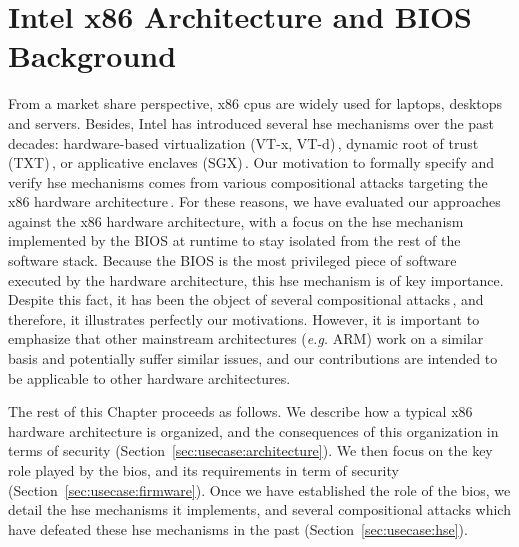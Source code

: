 \chapter{Intel x86 Architecture and BIOS Background}
\label{chapter:usecase}



\vspace{1cm}\noindent From a market share perspective, x86 \acp{cpu} are widely
used for laptops, desktops and servers.
%
Besides, Intel has introduced several \ac{hse} mechanisms over the past decades:
hardware-based virtualization (VT-x, VT-d)\,\cite[Volume 3, Chapter
23]{intel2014manual}, dynamic root of trust (TXT)\,\cite{intel2015txt}, or
applicative enclaves (SGX)\,\cite[Volume 3, Chapter
36]{intel2014manual}\cite{costan2016sgxexplained}.
%
Our motivation to formally specify and verify \ac{hse} mechanisms comes from
various compositional attacks targeting the x86 hardware
architecture\,\cite{duflot2009smram,wojtczuk2009smram,kallenberg2015racecondition,domas2015sinkhole,kovah2015senter}.
%
For these reasons, we have evaluated our approaches against the x86 hardware
architecture, with a focus on the \ac{hse} mechanism implemented by the BIOS at
runtime to stay isolated from the rest of the software stack.
%
Because the BIOS is the most privileged piece of software executed by the
hardware architecture, this \ac{hse} mechanism is of key importance.
%
Despite this fact, it has been the object of several compositional
attacks\,\cite{duflot2009smram,wojtczuk2009smram,domas2015sinkhole}, and
therefore, it illustrates perfectly our motivations.
%
However, it is important to emphasize that other mainstream architectures
(\emph{e.g.}  ARM) work on a similar basis and potentially suffer similar
issues, and our contributions are intended to be applicable to other hardware
architectures.
%

The rest of this Chapter proceeds as follows.
%
We describe how a typical x86 hardware architecture is organized, and the
consequences of this organization in terms of security
(Section~\ref{sec:usecase:architecture}).
%
We then focus on the key role played by the \ac{bios}, and its requirements in
term of security (Section~\ref{sec:usecase:firmware}).
%
Once we have established the role of the \ac{bios}, we detail the \ac{hse}
mechanisms it implements, and several compositional attacks which have defeated
these \ac{hse} mechanisms in the past (Section~\ref{sec:usecase:hse}).

